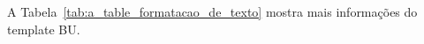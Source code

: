 A Tabela~\ref{tab:a_table_formatacao_de_texto} mostra mais informações do template BU.

%
%
%
%
%
%
\setlength\extrarowheight{2pt}
